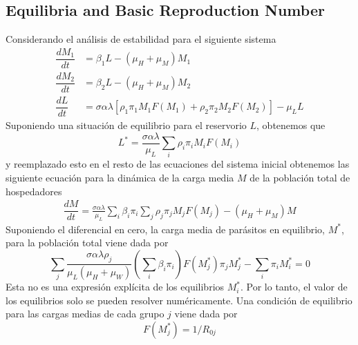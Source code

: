 \documentclass[12pt,a4paper]{article}
\theoremstyle{plain}%
\theoremstyle{definition}
\theoremstyle{remark}
\begin{document}
	\subsection{Equilibria and Basic Reproduction Number}\label{subsec:apendice-model1}
	Considerando el análisis de estabilidad para el siguiente sistema 
	\begin{equation}
	\begin{split}
	\dfrac{dM_1}{dt}&=\beta_1 L - (\mu_H+\mu_M) M_1\\%
	\dfrac{d M_2}{dt}&=\beta_2 L - (\mu_{H}+\mu_M) M_2\\
	\dfrac{dL}{dt}&=\sigma \alpha \lambda \left[ \rho_1 \pi_1 M_1 F(M_1)+ \rho_2 \pi_2 M_2 F(M_2) \right]   - \mu_L L 
	\end{split}
	\end{equation} 
	Suponiendo una situación de equilibrio para el reservorio $L$, obtenemos que 
	\begin{equation}
	L^*=\frac{ \sigma \alpha \lambda}{\mu_L}  \sum_i  \rho_i \pi_i M_i F(M_i) 
	\end{equation} 
	y reemplazado esto en el resto de las ecuaciones del sistema inicial obtenemos las siguiente ecuación para la dinámica de la carga media $M$ de la población total de hospedadores 
	\begin{equation}
	\begin{split}
	\dfrac{dM}{dt}=  \frac{ \sigma \alpha \lambda}{\mu_L} \sum_i \beta_i \pi_i \sum_j  \rho_j \pi_j M_j F(M_j)  -(\mu_{H}+\mu_M) M%
	\end{split}
	\end{equation}
	Suponiendo el diferencial en cero, la carga media de parásitos en equilibrio, $M^*$, para la población total
	viene dada por
	\begin{equation}
	\sum_j \frac{ \sigma \alpha \lambda \rho_j}{\mu_L(\mu_{H}+\mu_W)} \left( \sum_i \beta_i  \pi_i \right) F(M^*_j) \pi_j M^*_j - \sum_i  \pi_i M^*_i=0 
	\end{equation}
	Esta no es una expresión explícita de los equilibrios $M_i^*$. Por lo tanto, el valor de los equilibrios solo se pueden resolver numéricamente. 
	Una condición de equilibrio para las cargas medias de cada grupo $j$ viene dada por 
	\begin{equation}\label{eqequilibrio}
	F(M^*_j)=1/R_{0j}
	\end{equation}
\end{document}
